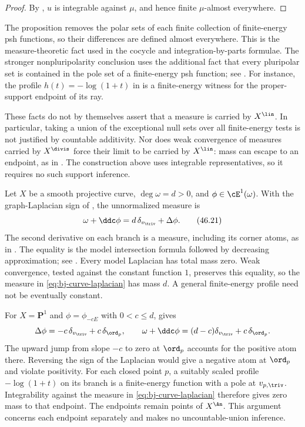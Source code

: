\begin{proof}
By , $u$ is integrable against $\mu$, and hence
finite $\mu$-almost everywhere.
\end{proof}

\begin{remark}
\label{rem:ch46-mass-location}
The proposition removes the polar sets of each finite collection of
finite-energy psh functions, so their differences are defined almost
everywhere.  This is the measure-theoretic fact used in the cocycle and
integration-by-parts formulae.
The stronger nonpluripolarity conclusion uses the additional fact that
every pluripolar set is contained in the pole set of a finite-energy
psh function; see \cite[Corollaries~7.48--7.49]{BJ22}.
For instance, the profile $h(t)=-\log(1+t)$ in
 is a finite-energy witness for the
proper-support endpoint of its ray.

These facts do not by themselves assert that a measure is carried by
$X^{\lin}$.  In particular, taking a union of the exceptional null sets
over all finite-energy tests is not justified by countable additivity.
Nor does weak convergence of measures carried by $X^{\divis}$ force
their limit to be carried by $X^{\lin}$: mass can escape to an endpoint,
as in .
The construction above uses integrable representatives, so it requires
no such support inference.
\end{remark}

\begin{example}
\label{ex:ch46-curve-laplacian}
Let $X$ be a smooth projective curve, $\deg\omega=d>0$, and
$\phi\in\cE^1(\omega)$.  With the graph-Laplacian sign of
, the unnormalized measure is
\[
             \omega+\ddc\phi=d\,\delta_{v_{\triv}}+\Delta\phi.
\tag{46.21}\label{eq:bj-curve-laplacian}
\]
The second derivative on each branch is a measure, including its
corner atoms, as in .  The equality is the model
intersection formula followed by decreasing approximation;
see \cite[Example~7.20]{BJ22}.
Every model Laplacian has total mass zero.  Weak convergence, tested
against the constant function $1$, preserves this equality, so the
measure in \eqref{eq:bj-curve-laplacian} has mass $d$.
A general finite-energy profile need not be eventually constant.

For $X=\mathbf P^1$ and $\phi=\phi_{-cE}$ with $0<c\leq d$,
 gives
\[
 \Delta\phi=-c\,\delta_{v_{\triv}}+c\,\delta_{\ord_p},
 \qquad
 \omega+\ddc\phi=(d-c)\delta_{v_{\triv}}+c\,\delta_{\ord_p}.
\]
The upward jump from slope $-c$ to zero at $\ord_p$ accounts for the
positive atom there.  Reversing the sign of the Laplacian would give
a negative atom at $\ord_p$ and violate positivity.
For each closed point $p$, a suitably scaled profile
$-\log(1+t)$ on its branch is a finite-energy function with a pole at
$v_{p,\triv}$.  Integrability against the measure in
\eqref{eq:bj-curve-laplacian} therefore gives zero mass to that endpoint.
The endpoints remain points of $X^{\An}$.  This argument concerns each
endpoint separately and makes no uncountable-union inference.
\end{example}

